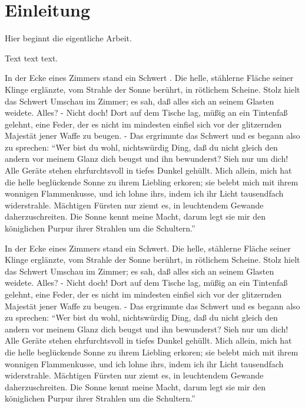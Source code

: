 \chapter{Einleitung}\label{einleitung}
Hier beginnt die eigentliche Arbeit.

Text text text.

In der Ecke eines Zimmers stand ein Schwert \cite{btt:1998}. Die helle, stählerne Fläche seiner
Klinge erglänzte, vom Strahle der Sonne berührt, in rötlichem Scheine. Stolz
hielt das Schwert Umschau im Zimmer; es sah, daß alles sich an seinem Glasten
weidete. Alles? - Nicht doch! Dort auf dem Tische lag, müßig an ein Tintenfaß
gelehnt, eine Feder, der es nicht im mindesten einfiel sich vor der
glitzernden Majestät jener Waffe zu beugen. - Das ergrimmte das Schwert und es
begann also zu sprechen: \enquote{Wer bist du wohl, nichtswürdig Ding, daß du nicht
gleich den andern vor meinem Glanz dich beugst und ihn bewunderst? Sieh nur
um dich! Alle Geräte stehen ehrfurchtsvoll in tiefes Dunkel gehüllt. Mich
allein, mich hat die helle beglückende Sonne zu ihrem Liebling erkoren; sie
belebt mich mit ihrem wonnigen Flammenkusse, und ich lohne ihrs, indem ich ihr
Licht tausendfach widerstrahle. Mächtigen Fürsten nur ziemt es, in leuchtendem
Gewande daherzuschreiten. Die Sonne kennt meine Macht, darum legt sie mir den
königlichen Purpur ihrer Strahlen um die Schultern.}

In der Ecke eines Zimmers stand ein Schwert. Die helle, stählerne Fläche seiner
Klinge erglänzte, vom Strahle der Sonne berührt, in rötlichem Scheine. Stolz
hielt das Schwert Umschau im Zimmer; es sah, daß alles sich an seinem Glasten
weidete. Alles? - Nicht doch! Dort auf dem Tische lag, müßig an ein Tintenfaß
gelehnt, eine Feder, der es nicht im mindesten einfiel sich vor der
glitzernden Majestät jener Waffe zu beugen. - Das ergrimmte das Schwert und es
begann also zu sprechen: \enquote{Wer bist du wohl, nichtswürdig Ding, daß du nicht
gleich den andern vor meinem Glanz dich beugst und ihn bewunderst? Sieh nur
um dich! Alle Geräte stehen ehrfurchtsvoll in tiefes Dunkel gehüllt. Mich
allein, mich hat die helle beglückende Sonne zu ihrem Liebling erkoren; sie
belebt mich mit ihrem wonnigen Flammenkusse, und ich lohne ihrs, indem ich ihr
Licht tausendfach widerstrahle. Mächtigen Fürsten nur ziemt es, in leuchtendem
Gewande daherzuschreiten. Die Sonne kennt meine Macht, darum legt sie mir den
königlichen Purpur ihrer Strahlen um die Schultern.}

